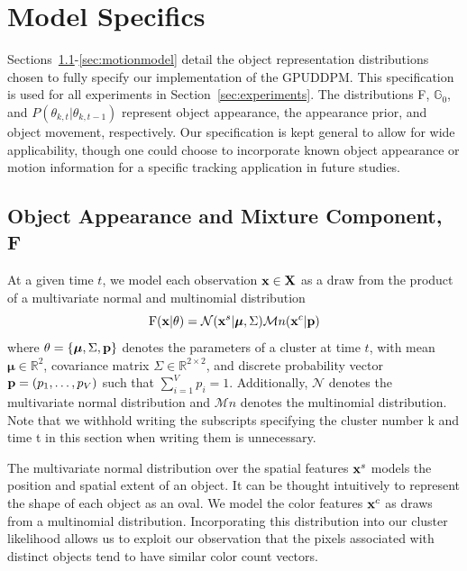 \documentclass[twocolumn, final]{svjour3}
\begin{document}

\section{Model Specifics}
\label{sec:modelspecification}

Sections~\ref{sec:objectappearance}-\ref{sec:motionmodel} detail the object representation distributions chosen to fully specify our implementation of the GPUDDPM. This specification is used for all experiments in Section~\ref{sec:experiments}. The distributions F, $\mathbb{G}_{0}$, and $P(\theta_{k, t} | \theta_{k, t-1})$ represent object appearance, the appearance prior, and object movement, respectively. Our specification is kept general to allow for wide applicability, though one could choose to incorporate known object appearance or motion information for a specific tracking application in future studies.


\subsection{Object Appearance and Mixture Component, F}
\label{sec:objectappearance}

At a given time $t$, we model each observation $\bold{x} \in \bold{X}$ as a draw from the product of a multivariate normal and multinomial distribution
\begin{equation}
\label{likelihood}
\text{F}(\bold{x}|\theta) = \mathcal{N}(\bold{x}^{s} | \boldsymbol{\mu}, \Sigma)  \mathcal{M}n(\bold{x}^{c} | \bold{p})
\end{equation}
where $\theta = \{ \boldsymbol{\mu}, \Sigma, \bold{p} \}$ denotes the parameters of a cluster at time $t$, with mean $\boldsymbol{\mu} \in \mathbb{R}^{2}$, covariance matrix $\Sigma \in \mathbb{R}^{2\times2}$, and discrete probability vector $\bold{p} = (p_{1}, \ldots, p_{V})$ such that $\sum_{i=1}^{V}p_{i} = 1$. Additionally, $\mathcal{N}$ denotes the multivariate normal distribution and $\mathcal{M}n$ denotes the multinomial distribution. Note that we withhold writing the subscripts specifying the cluster number k and time t in this section when writing them is unnecessary.

The multivariate normal distribution over the spatial features $\bold{x}^{s}$ models the position and spatial extent of an object. It can be thought intuitively to represent the shape of each object as an oval. We model the color features $\bold{x}^{c}$ as draws from a multinomial distribution. Incorporating this distribution into our cluster likelihood allows us to exploit our observation that the pixels associated with distinct objects tend to have similar color count vectors.
\end{document}
